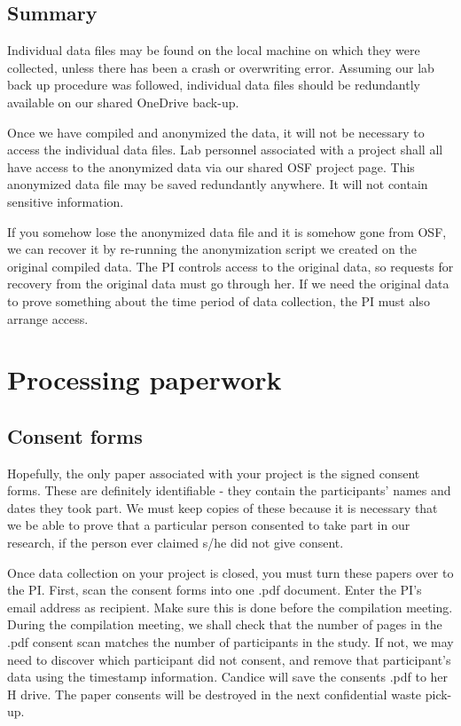 \documentclass[12pt,]{book}
\theoremstyle{definition}
\theoremstyle{definition}
\theoremstyle{definition}
\theoremstyle{remark}
\begin{document}
\subsection{Summary}\label{summary}

Individual data files may be found on the local machine on which they
were collected, unless there has been a crash or overwriting error.
Assuming our lab back up procedure was followed, individual data files
should be redundantly available on our shared OneDrive back-up.

Once we have compiled and anonymized the data, it will not be necessary
to access the individual data files. Lab personnel associated with a
project shall all have access to the anonymized data via our shared OSF
project page. This anonymized data file may be saved redundantly
anywhere. It will not contain sensitive information.

If you somehow lose the anonymized data file and it is somehow gone from
OSF, we can recover it by re-running the anonymization script we created
on the original compiled data. The PI controls access to the original
data, so requests for recovery from the original data must go through
her. If we need the original data to prove something about the time
period of data collection, the PI must also arrange access.

\section{Processing paperwork}\label{processing-paperwork}

\subsection{Consent forms}\label{consent-forms}

Hopefully, the only paper associated with your project is the signed
consent forms. These are definitely identifiable - they contain the
participants' names and dates they took part. We must keep copies of
these because it is necessary that we be able to prove that a particular
person consented to take part in our research, if the person ever
claimed s/he did not give consent.

Once data collection on your project is closed, you must turn these
papers over to the PI. First, scan the consent forms into one .pdf
document. Enter the PI's email address as recipient. Make sure this is
done before the compilation meeting. During the compilation meeting, we
shall check that the number of pages in the .pdf consent scan matches
the number of participants in the study. If not, we may need to discover
which participant did not consent, and remove that participant's data
using the timestamp information. Candice will save the consents .pdf to
her H drive. The paper consents will be destroyed in the next
confidential waste pick-up.
\end{document}

